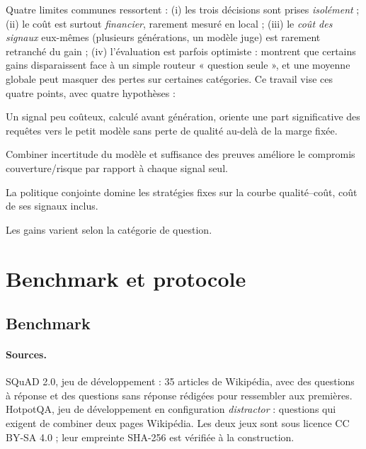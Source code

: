 \documentclass[11pt,a4paper]{article}
\begin{document}
Quatre limites communes ressortent : (i) les trois décisions sont prises \emph{isolément} ; (ii) le coût
est surtout \emph{financier}, rarement mesuré en local ; (iii) le \emph{coût des signaux} eux-mêmes
(plusieurs générations, un modèle juge) est rarement retranché du gain ; (iv) l'évaluation est parfois
optimiste : \citet{li2026beyond} montrent que certains gains disparaissent face à un simple routeur
« question seule », et une moyenne globale peut masquer des pertes sur certaines catégories. Ce travail
vise ces quatre points, avec quatre hypothèses :
\begin{description}[style=sameline,leftmargin=1cm]
\item[H1] Un signal peu coûteux, calculé avant génération, oriente une part significative des requêtes
vers le petit modèle sans perte de qualité au-delà de la marge fixée.
\item[H2] Combiner incertitude du modèle et suffisance des preuves améliore le compromis
couverture/risque par rapport à chaque signal seul.
\item[H3] La politique conjointe domine les stratégies fixes sur la courbe qualité--coût, coût de ses
signaux inclus.
\item[H4] Les gains varient selon la catégorie de question.
\end{description}

\section{Benchmark et protocole}\label{sec:protocole}

\subsection{Benchmark}

\paragraph{Sources.} SQuAD 2.0, jeu de développement \citep{rajpurkar2018squad2} : 35 articles de
Wikipédia, avec des questions à réponse et des questions sans réponse rédigées pour ressembler aux
premières. HotpotQA, jeu de développement en configuration \emph{distractor} \citep{yang2018hotpotqa} :
questions qui exigent de combiner deux pages Wikipédia. Les deux jeux sont sous licence CC BY-SA 4.0 ;
leur empreinte SHA-256 est vérifiée à la construction.
\end{document}
